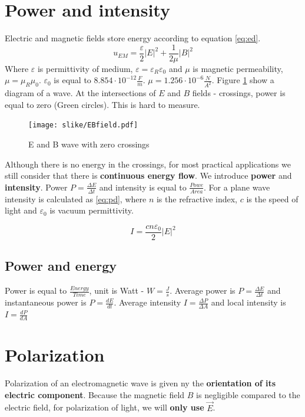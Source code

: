 \section{Power and intensity}
Electric and magnetic fields store energy according to equation \ref{eq:ed}.
\begin{equation}
    u_{EM} = \frac{\varepsilon}{2} |E|^2 + \frac{1}{2\mu} |B|^2
    \label{eq:ed}
\end{equation}
Where $\varepsilon$ is permittivity of medium, $\varepsilon = \varepsilon_R \varepsilon_0$
and $\mu$ is magnetic permeability, $\mu = \mu_R \mu_0$. $\varepsilon_0$ is equal to $8.854 \cdot 10^{-12} \frac{F}{m}$.
$\mu = 1.256 \cdot 10^{-6} \frac{N}{A^{2}}$.
Figure \ref{fig:EBwave} show a diagram of a wave. At the intersections of $E$ and $B$ fields
- crossings, power is equal to zero (Green circles). This is hard to measure.
\begin{figure}[h!]
    \centering
    \texttt{[image: slike/EBfield.pdf]}
    \caption{E and B wave with zero crossings}
    \label{fig:EBwave}
\end{figure}

Although there is no energy in the crossings, for most practical applications
we still consider that there is \textbf{continuous energy flow}. 
We introduce \textbf{power} and \textbf{intensity}. 
Power $P = \frac{\Delta E}{\Delta t}$ and intensity is equal to $\frac{Powe}{Area}$. 
For a plane wave intensity is calculated as \ref{eq:pd}, where $n$ is the refractive index, $c$ is the speed of light and $\varepsilon_0$ is vacuum 
permittivity. 

\begin{equation}
    I = \frac{c n \varepsilon_0}{2} |E|^2
    \label{eq:pd}
\end{equation}

\subsection{Power and energy}
Power is equal to $\frac{Energy}{Time}$, unit is Watt - $W = \frac{J}{s}$.
Average power is $P = \frac{\Delta E}{\Delta t}$ and instantaneous power is $P = \frac{dE}{dt}$.
Average intensity $I = \frac{\Delta P}{\Delta A}$  and local intensity is $I = \frac{d P}{d A}$

\section{Polarization}

Polarization of an electromagnetic wave is given ny the \textbf{orientation of its electric component}. Because the magnetic field $B$ is 
negligible compared to the electric field, for polarization of light, we will \textbf{only use} $\vec{E}$.

